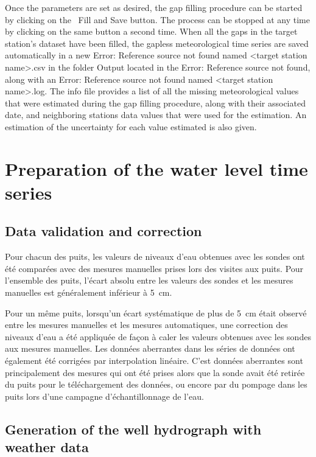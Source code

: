 \documentclass[12pt, letterpaper, fleqn]{report}
\begin{document}
Once the parameters are set as desired, the gap filling procedure can be started by clicking on the        Fill and Save button. The process can be stopped at any time by clicking on the same button a second time. When all the gaps in the target station's dataset have been filled, the gapless meteorological time series are saved automatically in a new Error: Reference source not found named <target station name>.csv in the folder Output located in the Error: Reference source not found, along with an Error: Reference source not found named <target station name>.log. The info file provides a list of all the missing meteorological values that were estimated during the gap filling procedure, along with their associated date, and neighboring stations data values that were used for the estimation. An estimation of the uncertainty for each value estimated is also given.

\section{Preparation of the water level time series}

\subsection{Data validation and correction}

Pour chacun des puits, les valeurs de niveaux d’eau obtenues avec les sondes ont été comparées avec des mesures manuelles prises lors des visites aux puits. Pour l’ensemble des puits, l’écart absolu entre les valeurs des sondes et les mesures manuelles est généralement inférieur à 5 cm.

Pour un même puits, lorsqu'un écart systématique de plus de 5 cm était observé entre les mesures manuelles et les mesures automatiques, une correction des niveaux d’eau a été  appliquée de façon à caler les valeurs obtenues avec les sondes aux mesures manuelles.
Les données aberrantes dans les séries de données ont également été corrigées par interpolation linéaire. C’est données aberrantes sont principalement des mesures qui ont été prises alors que la sonde avait été retirée du puits pour le téléchargement des données, ou encore par du pompage dans les puits lors d’une campagne d’échantillonnage de l’eau.

\subsection{Generation of the well hydrograph with weather data}
\end{document}
